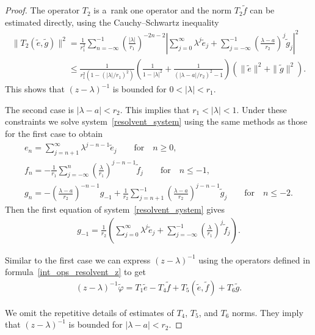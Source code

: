 \begin{proof}
The operator $T_2$ is a~rank one operator and the norm $T_2\tilde{f}$ can be estimated directly, using the
Cauchy--Schwartz inequality
\begin{gather*}
\|T_2(\tilde{e},\tilde{g})\|^2=
\frac{1}{r_1^2}\sum\limits_{n=-\infty}^{-1}\left(\frac{|\lambda|}{r_1}\right)^{-2n-2}\left|\sum\limits_{j=0}^\infty\lambda^j\tilde{e}_j
+ \sum\limits_{j=-\infty}^{-1}\left(\frac{\lambda-a}{r_2}\right)^j\tilde{g}_j\right|^2
\\
\phantom{\|T_2(\tilde{e},\tilde{g})\|^2}{}
 \le\frac{1}{r_1^2(1-(|\lambda|/r_1)^2)}\left(\frac{1}{1-|\lambda|^2}+ \frac{1}{(|\lambda-a|/r_2)^2-1}\right)
\left(\|\tilde{e}\|^2+\|\tilde{g}\|^2\right).
\end{gather*}
This shows that $(z-\lambda)^{-1}$ is bounded for $0<|\lambda|<r_1$.

The second case is $|\lambda-a|<r_2$.
This implies that $r_1<|\lambda|<1$.
Under these constraints we solve system~\eqref{resolvent_system} using the same methods as those for the f\/irst case to
obtain
\begin{gather*}
e_n =\sum\limits_{j=n+1}^\infty \lambda^{j-n-1}\tilde{e}_j
\qquad\text{for}\quad n\ge0,
\\
f_n =-\frac{1}{r_1}\sum\limits_{j=-\infty}^n \left(\frac{\lambda}{r_1}\right)^{j-n-1}\tilde{f}_j
\qquad\text{for}\quad n\le-1,
\\
g_n =-\left(\frac{\lambda-a}{r_2}\right)^{-n-1}g_{-1}+\frac{1}{r_2}\sum\limits_{j=n+1}^{-1}\left(\frac{\lambda-a}{r_2}\right)^{j-n-1}\tilde{g}_j
\qquad
\text{for}
\quad
n\le-2.
\end{gather*}
Then the f\/irst equation of system~\eqref{resolvent_system} gives
\begin{gather*}
g_{-1}=\frac{1}{r_2}\left(\sum\limits_{j=0}^\infty\lambda^j\tilde{e}_j+\sum\limits_{j=-\infty}^{-1}\left(\frac{\lambda}{r_1}\right)^j\tilde{f}_j\right).
\end{gather*}

Similar to the f\/irst case we can express $(z-\lambda)^{-1}$ using the operators def\/ined in
formula~\eqref{int_ops_resolvent_z} to get
\begin{gather*}
(z-\lambda)^{-1}\tilde{\varphi}=T_1\tilde{e}-T_4\tilde{f}+T_5(\tilde{e},\tilde{f})+T_6\tilde{g}.
\end{gather*}

We omit the repetitive details of estimates of $T_4$, $T_5$, and $T_6$ norms.
They imply that $(z-\lambda)^{-1}$ is bounded for $|\lambda -a|<r_2$.


\end{proof}
